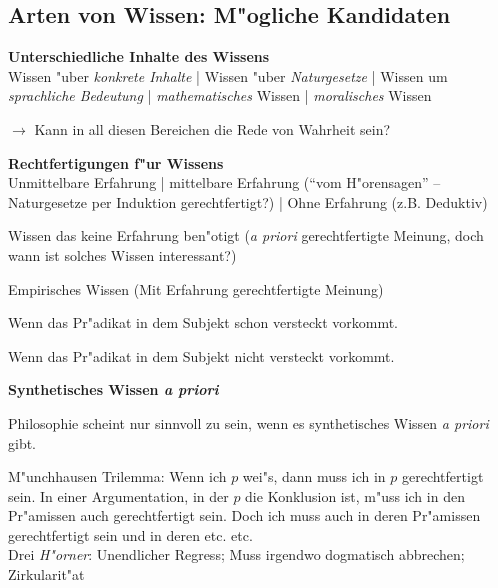 \documentclass[emulatestandardclasses]{scrartcl}
\begin{document}
\subsection{Arten von Wissen: M"ogliche Kandidaten}
\textbf{Unterschiedliche Inhalte des Wissens}\\
Wissen "uber \emph{konkrete Inhalte} | Wissen "uber \emph{Naturgesetze} | Wissen um \emph{sprachliche Bedeutung} | \emph{mathematisches} Wissen | \emph{moralisches} Wissen

\hspace{3mm}$\rightarrow$ Kann in all diesen Bereichen die Rede von Wahrheit sein?
\newline

\noindent\textbf{Rechtfertigungen f"ur Wissens}\\
Unmittelbare Erfahrung | mittelbare Erfahrung ("`vom H"orensagen"' -- Naturgesetze per Induktion gerechtfertigt?) | Ohne Erfahrung (z.B. Deduktiv)

\begin{description}[leftmargin=!,labelwidth=\widthof{\bfseries A posteriorisches Wissen}]
  \item[A priorisches Wissen] Wissen das keine Erfahrung ben"otigt (\emph{a priori} gerechtfertigte Meinung, doch wann ist solches Wissen interessant?)
  \item[A posteriorisches Wissen] Empirisches Wissen (Mit Erfahrung gerechtfertigte Meinung)
  \item[Analytisches Urteil] Wenn das Pr"adikat in dem Subjekt schon versteckt vorkommt.
  \item[Synthetisches Urteil] Wenn das Pr"adikat in dem Subjekt nicht versteckt vorkommt.
\end{description}
\vspace{3mm}
\noindent\textbf{Synthetisches Wissen \emph{a priori}}\\

\begin{center}
Philosophie scheint nur sinnvoll zu sein, wenn es synthetisches Wissen \emph{a priori} gibt.
\end{center}

M"unchhausen Trilemma: Wenn ich $p$ wei"s, dann muss ich in $p$ gerechtfertigt sein. In einer Argumentation, in der $p$ die Konklusion ist, m"uss ich in den Pr"amissen auch gerechtfertigt sein. Doch ich muss auch in deren Pr"amissen gerechtfertigt sein und in deren etc. etc.\\
Drei \emph{H"orner}: Unendlicher Regress; Muss irgendwo dogmatisch abbrechen; Zirkularit"at
\end{document}
